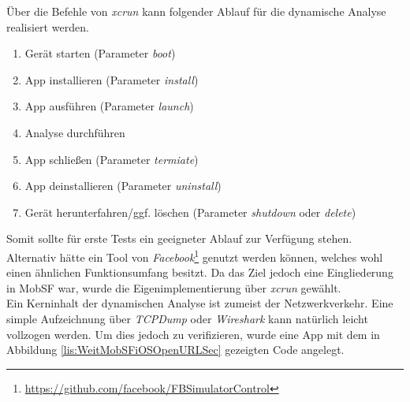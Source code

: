 
\pagebreak
Über die Befehle von \textit{xcrun} kann folgender Ablauf für die dynamische Analyse realisiert werden.
\begin{enumerate}
	\item Gerät starten (Parameter \textit{boot})
	\item App installieren (Parameter \textit{install})
	\item App ausführen (Parameter \textit{launch})
	\item Analyse durchführen
	\item App schließen (Parameter \textit{termiate})
	\item App deinstallieren (Parameter \textit{uninstall})
	\item Gerät herunterfahren/ggf. löschen (Parameter \textit{shutdown} oder \textit{delete})
\end{enumerate}
Somit sollte für erste Tests ein geeigneter Ablauf zur Verfügung stehen. Alternativ hätte ein Tool von \textit{Facebook}\footnote{\url{https://github.com/facebook/FBSimulatorControl}} genutzt werden können, welches wohl einen ähnlichen Funktionsumfang besitzt. Da das Ziel jedoch eine Eingliederung in MobSF war, wurde die Eigenimplementierung über \textit{xcrun} gewählt.\\

Ein Kerninhalt der dynamischen Analyse ist zumeist der Netzwerkverkehr. Eine simple Aufzeichnung über \textit{TCPDump} oder \textit{Wireshark} kann natürlich leicht vollzogen werden. Um dies jedoch zu verifizieren, wurde eine App mit dem in Abbildung \ref{lis:WeitMobSFiOSOpenURLSec} gezeigten Code angelegt.\\

